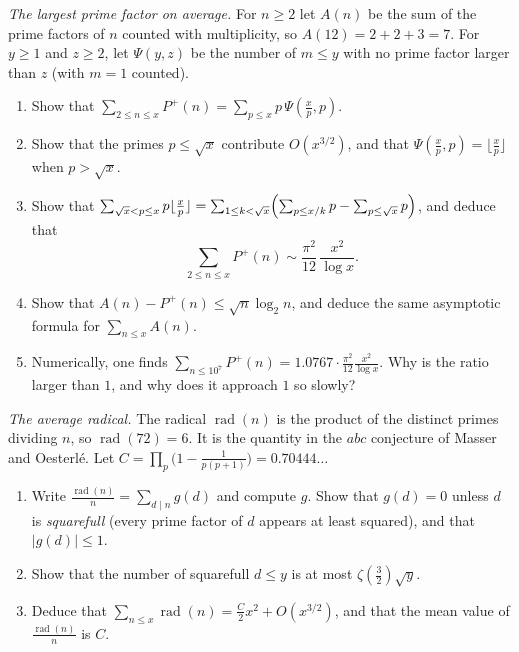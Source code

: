 \begin{exercise}[$\star\star\star$]\label{pb:largestpf}
\emph{The largest prime factor on average.} For $n\ge2$ let $A(n)$ be the sum of the prime factors of $n$ counted with multiplicity, so $A(12)=2+2+3=7$. For $y\ge1$ and
$z\ge2$, let $\Psi(y,z)$ be the number of $m\le y$ with no prime factor larger than $z$ (with $m=1$ counted).
\begin{enumerate}[label=(\alph*)]
\item Show that $\sum_{2\le n\le x}P^+(n)=\sum_{p\le x}p\,\Psi(\frac xp,p)$.
\item Show that the primes $p\le\sqrt x$ contribute $O(x^{3/2})$, and that $\Psi(\frac xp,p)=\lfloor\frac xp\rfloor$ when $p>\sqrt x$.
\item Show that $\sum_{\sqrt x<p\le x}p\lfloor\frac xp\rfloor=\sum_{1\le k<\sqrt x}\Bigl(\sum_{p\le x/k}p-\sum_{p\le\sqrt x}p\Bigr)$, and deduce that
\[
\sum_{2\le n\le x}P^+(n)\sim\frac{\pi^2}{12}\,\frac{x^2}{\log x}.
\]
\item Show that $A(n)-P^+(n)\le\sqrt n\log_2n$, and deduce the same asymptotic formula for $\sum_{n\le x}A(n)$.
\item Numerically, one finds $\sum_{n\le10^7}P^+(n)=1.0767\cdot\frac{\pi^2}{12}\frac{x^2}{\log x}$. Why is the ratio larger than $1$, and why does it approach $1$ so slowly?
\end{enumerate}
\end{exercise}

\begin{exercise}[$\star\star$]\label{pb:radical}
\emph{The average radical.} The radical $\operatorname{rad}(n)$ is the product of the distinct primes dividing $n$, so $\operatorname{rad}(72)=6$. It is the quantity in
the $abc$ conjecture of Masser and Oesterl\'e. Let $C=\prod_p\bigl(1-\frac1{p(p+1)}\bigr)=0.70444\ldots$
\begin{enumerate}[label=(\alph*)]
\item Write $\frac{\operatorname{rad}(n)}n=\sum_{d\mid n}g(d)$ and compute $g$. Show that $g(d)=0$ unless $d$ is \emph{squarefull} (every prime factor of $d$ appears at
least squared), and that $|g(d)|\le1$.
\item Show that the number of squarefull $d\le y$ is at most $\zeta(\frac32)\sqrt y$.
\item Deduce that $\sum_{n\le x}\operatorname{rad}(n)=\frac C2x^2+O(x^{3/2})$, and that the mean value of $\frac{\operatorname{rad}(n)}n$ is $C$.
\end{enumerate}
\end{exercise}

